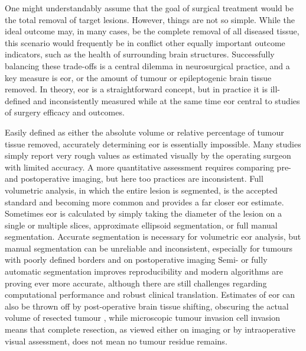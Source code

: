 One might understandably assume that the goal of surgical treatment would be the total removal of target lesions.
However, things are not so simple.
While the ideal outcome may, in many cases, be the complete removal of all diseased tissue, this scenario would frequently be in conflict other equally important outcome indicators, such as the health of surrounding brain structures.
Successfully balancing these trade-offs is a central dilemma in neurosurgical practice, and a key measure is \gls{eor}, or the amount of tumour or epileptogenic brain tissue removed.
In theory, \gls{eor} is a straightforward concept, but in practice it is ill-defined and inconsistently measured while at the same time \gls{eor} central to studies of surgery efficacy and outcomes.

Easily defined as either the absolute volume or relative percentage of tumour tissue removed, accurately determining \gls{eor} is essentially impossible.
Many studies simply report very rough values as estimated visually by the operating surgeon with limited accuracy\autocite{Sanai2008,Martino2013,Lau2018,Sezer2020}.
A more quantitative assessment requires comparing pre- and postoperative imaging, but here too practices are inconsistent\autocite{Wykes2021}.
Full volumetric analysis, in which the entire lesion is segmented, is the accepted standard and becoming more common and provides a far closer \gls{eor} estimate.
Sometimes \gls{eor} is calculated by simply taking the diameter of the lesion on a single or multiple slices, approximate ellipsoid segmentation, or full manual segmentation\autocite{Sanai2008,Albuquerque2021}.
Accurate segmentation is necessary for volumetric \gls{eor} analysis, but manual segmentation can be unreliable and inconsistent, especially for tumours with poorly defined borders and on postoperative imaging \autocite{Ertl-Wagner2009,Bo2017,Visser2019}
Semi- or fully automatic segmentation improves reproducibility\autocite{Ertl-Wagner2009,Sezer2020} and modern algorithms are proving ever more accurate, although there are still challenges regarding computational performance and robust clinical translation\autocite{Angulakshmi2017,Wadhwa2019,Fawzi2021}.
Estimates of \gls{eor} can also be thrown off by post-operative brain tissue shifting, obscuring the actual volume of resected tumour \autocite{Schucht2014a}, while microscopic tumour invasion cell invasion means that complete resection, as viewed either on imaging or by intraoperative visual assessment, does not mean no tumour residue remains\autocite{Yordanova2017}.


